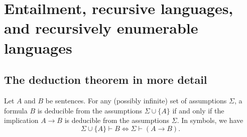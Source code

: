 \section{Entailment, recursive languages, and recursively enumerable languages}

\subsection{The deduction theorem in more detail}

\begin{theorem}
    Let \(A\) and \(B\) be sentences. For any (possibly infinite) set of assumptions \(\Sigma\), a formula \(B\) is deducible from the assumptions \(\Sigma\cup\{A\}\) if and only if the implication \(A\rightarrow B\) is deducible from the assumptions \(\Sigma\). In symbols, we have
    \[\Sigma\cup\{A\}\vdash B \iff \Sigma\vdash(A\rightarrow B)\text{.}\]
\end{theorem}
